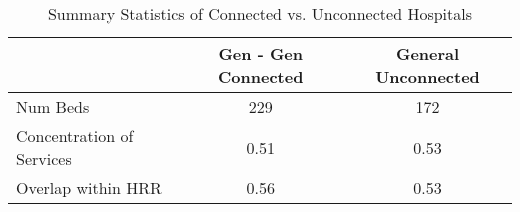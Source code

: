 \begin{table}[ht!]

\caption{Summary Statistics of Connected vs. Unconnected Hospitals}
\centering
\begin{tabular}[t]{lcc}
\toprule
& Gen - Gen Connected & General Unconnected\\
\midrule
Num Beds & 229 & 172\\
Concentration of Services & 0.51 & 0.53\\
Overlap within HRR & 0.56 & 0.53\\
\bottomrule
\end{tabular}
\end{table}
